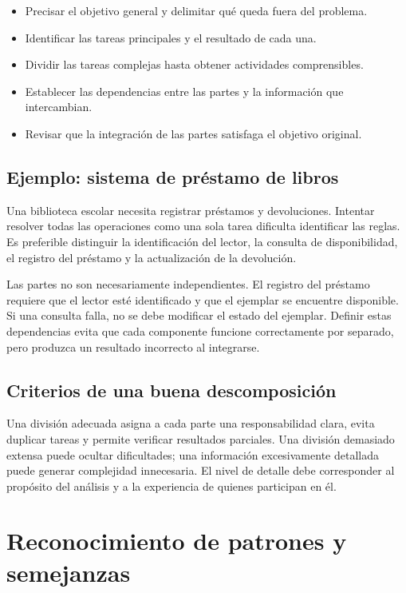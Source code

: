 \begin{itemize}
\item Precisar el objetivo general y delimitar qué queda fuera del problema.
\item Identificar las tareas principales y el resultado de cada una.
\item Dividir las tareas complejas hasta obtener actividades comprensibles.
\item Establecer las dependencias entre las partes y la información que intercambian.
\item Revisar que la integración de las partes satisfaga el objetivo original.
\end{itemize}

\subsection{Ejemplo: sistema de préstamo de libros}

Una biblioteca escolar necesita registrar préstamos y devoluciones. Intentar resolver todas las operaciones como una sola tarea dificulta identificar las reglas. Es preferible distinguir la identificación del lector, la consulta de disponibilidad, el registro del préstamo y la actualización de la devolución.



Las partes no son necesariamente independientes. El registro del préstamo requiere que el lector esté identificado y que el ejemplar se encuentre disponible. Si una consulta falla, no se debe modificar el estado del ejemplar. Definir estas dependencias evita que cada componente funcione correctamente por separado, pero produzca un resultado incorrecto al integrarse.

\subsection{Criterios de una buena descomposición}

Una división adecuada asigna a cada parte una responsabilidad clara, evita duplicar tareas y permite verificar resultados parciales. Una división demasiado extensa puede ocultar dificultades; una información excesivamente detallada puede generar complejidad innecesaria. El nivel de detalle debe corresponder al propósito del análisis y a la experiencia de quienes participan en él.

\section{Reconocimiento de patrones y semejanzas}

